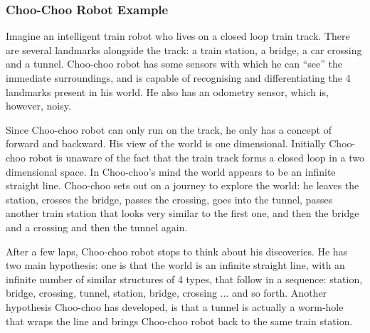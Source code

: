 



\subsubsection{Choo-Choo Robot Example}

Imagine an intelligent train robot who lives on a closed loop train
track. There are several landmarks alongside the track: a train
station, a bridge, a car crossing and a tunnel. Choo-choo robot has
some sensors with which he can ``see'' the immediate surroundings, and
is capable of recognising and differentiating the 4 landmarks
present in his world. He also has an odometry sensor, which is,
however, noisy.

Since Choo-choo robot can only run on the track, he only has a concept
of forward and backward. His view of the world is one dimensional.
Initially Choo-choo robot is unaware of the fact that the train track
forms a closed loop in a two dimensional space. In Choo-choo's mind
the world appears to be an infinite straight line. Choo-choo sets out
on a journey to explore the world: he leaves the station, crosses the
bridge, passes the crossing, goes into the tunnel, passes another
train station that looks very similar to the first one, and then the
bridge and a crossing and then the tunnel again.

After a few laps, Choo-choo robot stops to think about his
discoveries.  He has two main hypothesis: one is that the world is an
infinite straight line, with an infinite number of similar structures
of 4 types, that follow in a sequence: station, bridge, crossing,
tunnel, station, bridge, crossing ... and so forth. Another hypothesis
Choo-choo has developed, is that a tunnel is actually a worm-hole that
wraps the line and brings Choo-choo robot back to the same train
station.

